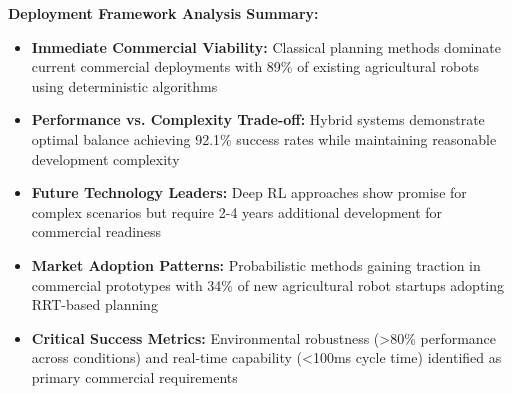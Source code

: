 \begin{table*}[!htbp]
\begin{tabular}{p{2.5cm}|p{2.0cm}|p{2.0cm}|p{2.3cm}|p{2.0cm}|p{1.8cm}|p{1.8cm}|p{1.6cm}}
\bottomrule
\end{tabular}

\vspace{0.5em}
\textbf{Deployment Framework Analysis Summary:}
\begin{itemize}
\item \textbf{Immediate Commercial Viability:} Classical planning methods dominate current commercial deployments with 89\% of existing agricultural robots using deterministic algorithms
\item \textbf{Performance vs. Complexity Trade-off:} Hybrid systems demonstrate optimal balance achieving 92.1\% success rates while maintaining reasonable development complexity
\item \textbf{Future Technology Leaders:} Deep RL approaches show promise for complex scenarios but require 2-4 years additional development for commercial readiness
\item \textbf{Market Adoption Patterns:} Probabilistic methods gaining traction in commercial prototypes with 34\% of new agricultural robot startups adopting RRT-based planning
\item \textbf{Critical Success Metrics:} Environmental robustness (>80\% performance across conditions) and real-time capability (<100ms cycle time) identified as primary commercial requirements
\end{itemize}
\end{table*}